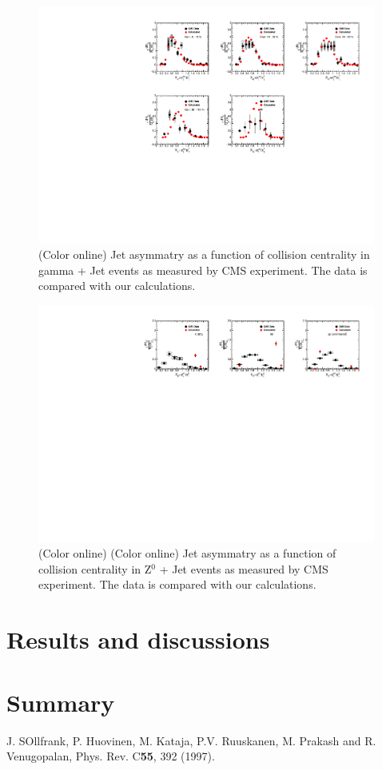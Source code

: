 \documentclass[reprint,amsmath,amssymb,aps,showpacs,showkeys]{revtex4}
\begin{document}
\begin{figure}
  \includegraphics[width=0.99\textwidth]{Figures/Fig_XJ_GammaJet_Centrality.pdf}
  \caption{(Color online) Jet asymmatry as a function of collision centrality
    in gamma + Jet events as measured by CMS experiment. The data is compared with our
    calculations.}
  \label{Fig:JetAsymGammaJetCent}
\end{figure}



\begin{figure}
  \includegraphics[width=0.99\textwidth]{Figures/Fig_XJ_Z0Jet_Centrality.pdf}
  \caption{(Color online) (Color online) Jet asymmatry as a function of collision centrality
    in Z$^{0}$ + Jet events as measured by CMS experiment. The data is compared with our
    calculations.}
  \label{Fig:JetAsymZ0JetCent}
\end{figure}

\section{Results and discussions}
\label{Sec:ResultsAndDiss}


\section{Summary}
\label{Sec:Summary}



\begin{thebibliography}{100}
  
 J. SOllfrank, P. Huovinen, M. Kataja, P.V. Ruuskanen,
  M. Prakash and R. Venugopalan, 
  Phys. Rev. C{\bf 55}, 392 (1997).

\end{thebibliography}
\end{document}
